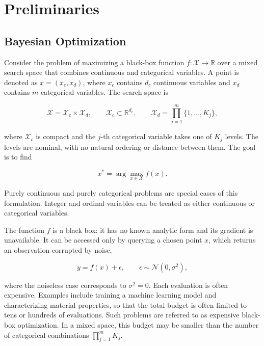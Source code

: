 
\chapter{Preliminaries}\label{chap:preliminaries}

\section{Bayesian Optimization}\label{sec:bayesian-optimization}

Consider the problem of maximizing a black-box function $f: \mathcal{X} \to \mathbb{R}$ over a mixed search space that combines continuous and categorical variables. A point is denoted as $x = (x_c, x_d)$, where $x_c$ contains $d_c$ continuous variables and $x_d$ contains $m$ categorical variables. The search space is

\begin{equation*}
  \mathcal{X} = \mathcal{X}_c \times \mathcal{X}_d, \qquad \mathcal{X}_c \subset \mathbb{R}^{d_c}, \qquad \mathcal{X}_d = \prod_{j=1}^{m} \{1, \dots, K_j\},
  \label{eq:search-space}
\end{equation*}

where $\mathcal{X}_c$ is compact and the $j$-th categorical variable takes one of $K_j$ levels. The levels are nominal, with no natural ordering or distance between them. The goal is to find

\begin{equation}
  x^* = \arg\max_{x \in \mathcal{X}} f(x).
  \label{eq:optimization-problem}
\end{equation}

Purely continuous and purely categorical problems are special cases of this formulation. Integer and ordinal variables can be treated as either continuous or categorical variables.

The function $f$ is a black box: it has no known analytic form and its gradient is unavailable. It can be accessed only by querying a chosen point $x$, which returns an observation corrupted by noise,

\begin{equation}
  y = f(x) + \epsilon, \qquad \epsilon \sim \mathcal{N}(0, \sigma^2),
  \label{eq:observation-model}
\end{equation}

where the noiseless case corresponds to $\sigma^2 = 0$. Each evaluation is often expensive. Examples include training a machine learning model and characterizing material properties, so that the total budget is often limited to tens or hundreds of evaluations. Such problems are referred to as expensive black-box optimization. In a mixed space, this budget may be smaller than the number of categorical combinations $\prod_{j=1}^{m} K_j$.

